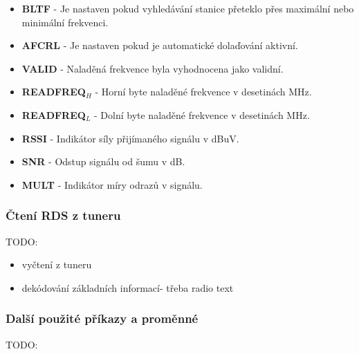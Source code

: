 \begin{itemize}
\item \textbf{BLTF} - Je nastaven pokud vyhledávání stanice přeteklo přes maximální nebo minimální frekvenci.
\item \textbf{AFCRL} - Je nastaven pokud je automatické dolaďování aktivní.
\item \textbf{VALID} - Naladěná frekvence byla vyhodnocena jako validní. 
\item \textbf{READFREQ$_{{H}}$} - Horní byte naladěné frekvence v desetinách MHz.
\item \textbf{READFREQ$_{{L}}$} - Dolní byte naladěné frekvence v desetinách MHz.
\item \textbf{RSSI} - Indikátor síly přijímaného signálu v dBuV. %
\item \textbf{SNR} - Odstup signálu od šumu v dB.
\item \textbf{MULT} - Indikátor míry odrazů v signálu.
\end{itemize}

\subsubsection{Čtení RDS z tuneru}
TODO:
\begin{itemize}
\item vyčtení z tuneru
\item dekódování základních informací- třeba radio text
\end{itemize}

\subsubsection{Další použité příkazy a proměnné}
TODO: